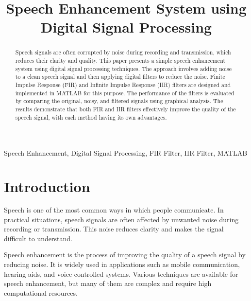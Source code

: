 \documentclass[conference]{IEEEtran}
\begin{document}
\title{Speech Enhancement System using Digital Signal Processing}

\author{
}

\maketitle

\begin{abstract}
Speech signals are often corrupted by noise during recording and transmission, which reduces their clarity and quality. This paper presents a simple speech enhancement system using digital signal processing techniques. The approach involves adding noise to a clean speech signal and then applying digital filters to reduce the noise. Finite Impulse Response (FIR) and Infinite Impulse Response (IIR) filters are designed and implemented in MATLAB for this purpose. The performance of the filters is evaluated by comparing the original, noisy, and filtered signals using graphical analysis. The results demonstrate that both FIR and IIR filters effectively improve the quality of the speech signal, with each method having its own advantages.
\end{abstract}

\begin{IEEEkeywords}
Speech Enhancement, Digital Signal Processing, FIR Filter, IIR Filter, MATLAB
\end{IEEEkeywords}

\section{Introduction}

Speech is one of the most common ways in which people communicate. In practical situations, speech signals are often affected by unwanted noise during recording or transmission. This noise reduces clarity and makes the signal difficult to understand.

Speech enhancement is the process of improving the quality of a speech signal by reducing noise. It is widely used in applications such as mobile communication, hearing aids, and voice-controlled systems. Various techniques are available for speech enhancement, but many of them are complex and require high computational resources.
\end{document}
